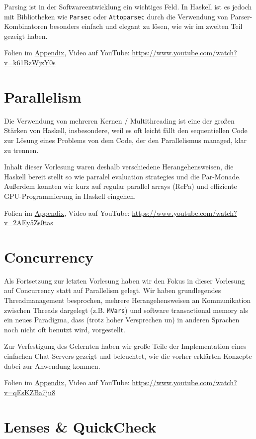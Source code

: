 \documentclass[10pt,a4paper]{article}
\begin{document}
Parsing ist in der Softwareentwicklung ein wichtiges Feld. In Haskell ist es jedoch mit Bibliotheken wie \texttt{Parsec} oder \texttt{Attoparsec} durch die Verwendung von Parser-Kombinatoren besonders einfach und elegant zu lösen, wie wir im zweiten Teil gezeigt haben. 

\smallskip\smallskip
Folien im \hyperref[v4]{Appendix}, Video auf YouTube: \;\url{https://www.youtube.com/watch?v=k61BzWjzY0s}

\section{Parallelism}

Die Verwendung von mehreren Kernen / Multithreading ist eine der großen Stärken von Haskell, insbesondere, weil es oft leicht fällt den sequentiellen Code zur Lösung eines Problems von dem Code, der den Parallelismus managed, klar zu trennen.

Inhalt dieser Vorlesung waren deshalb verschiedene Herangehensweisen, die Haskell bereit stellt so wie parralel evaluation strategies und die Par-Monade. Außerdem konnten wir kurz auf regular parallel arrays (RePa) und effiziente GPU-Programmierung in Haskell eingehen.

\smallskip\smallskip
Folien im \hyperref[v5]{Appendix}, Video auf YouTube: \;\url{https://www.youtube.com/watch?v=2AEy5Zs0tas}

\section{Concurrency}

Als Fortsetzung zur letzten Vorlesung haben wir den Fokus in dieser Vorlesung auf Concurrency statt auf Parallelism gelegt. Wir haben grundlegendes Threadmanagement besprochen, mehrere Herangehensweisen an Kommunikation zwischen Threads dargelegt (z.B. \texttt{MVars}) und software transactional memory als ein neues Paradigma, dass (trotz hoher Versprechen un) in anderen Sprachen noch nicht oft benutzt wird, vorgestellt.
\smallskip\smallskip

Zur Verfestigung des Gelernten haben wir große Teile der Implementation eines einfachen Chat-Servers gezeigt und beleuchtet, wie die vorher erklärten Konzepte dabei zur Anwendung kommen.

\smallskip\smallskip
Folien im \hyperref[v6]{Appendix}, Video auf YouTube: \;\url{https://www.youtube.com/watch?v=qEsKZBa7ju8}

\section{Lenses \& QuickCheck}
\end{document}
